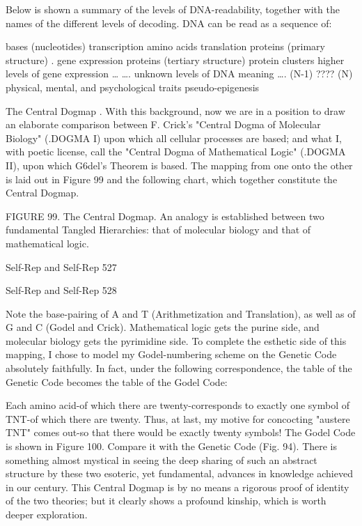 {Below is shown a summary of the levels of DNA-readability, together with the names of the
different levels of decoding. DNA can be read as a sequence of:

bases (nucleotides)                                                    transcription
amino acids                                                            translation
proteins (primary structure)                                        . gene expression
proteins (tertiary structure)
protein clusters                                       higher levels of gene expression
…
….      unknown levels of DNA meaning
….
(N-1) ????
(N) physical, mental, and
psychological traits                                           pseudo-epigenesis


                                    The Central Dogmap
.
With this background, now we are in a position to draw an elaborate comparison between F.
Crick's "Central Dogma of Molecular Biology" (.DOGMA I) upon which all cellular
processes are based; and what I, with poetic license, call the "Central Dogma of
Mathematical Logic" (.DOGMA II), upon which G6del's Theorem is based. The mapping
from one onto the other is laid out in Figure 99 and the following chart, which together
constitute the Central Dogmap.

FIGURE 99. The Central Dogmap. An analogy is established between two fundamental
Tangled Hierarchies: that of molecular biology and that of mathematical logic.




Self-Rep and Self-Rep                                                                      527

Self-Rep and Self-Rep   528

        Note the base-pairing of A and T (Arithmetization and Translation), as well as of G
and C (Godel and Crick). Mathematical logic gets the purine side, and molecular biology gets
the pyrimidine side.
        To complete the esthetic side of this mapping, I chose to model my Godel-numbering
scheme on the Genetic Code absolutely faithfully. In fact, under the following
correspondence, the table of the Genetic Code becomes the table of the Godel Code:




Each amino acid-of which there are twenty-corresponds to exactly one symbol of TNT-of
which there are twenty. Thus, at last, my motive for concocting "austere TNT" comes out-so
that there would be exactly twenty symbols! The Godel Code is shown in Figure 100.
Compare it with the Genetic Code (Fig. 94).
         There is something almost mystical in seeing the deep sharing of such an abstract
structure by these two esoteric, yet fundamental, advances in knowledge achieved in our
century. This Central Dogmap is by no means a rigorous proof of identity of the two theories;
but it clearly shows a profound kinship, which is worth deeper exploration.

}
